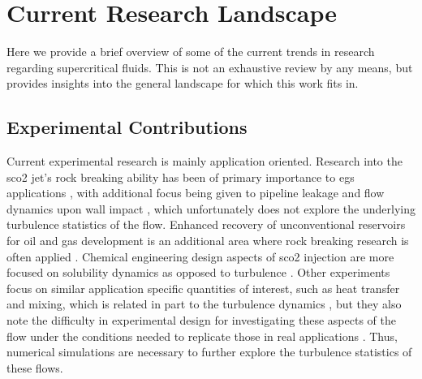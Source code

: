 
\section{Current Research Landscape}
Here we provide a brief overview of some of the current trends in research regarding supercritical fluids. This is not an exhaustive review by any means, but provides insights into the general landscape for which this work fits in. 
\subsection{Experimental Contributions}
Current experimental research is mainly application oriented. Research into the \gls{sco2} jet's rock breaking ability has been of primary importance to \gls{egs} applications \cite{EGScomp, EGS2, very_rock, experiment, rb}, with additional focus being given to pipeline leakage and flow dynamics upon wall impact \cite{WANG2015210, WANG201977}, which unfortunately does not explore the underlying turbulence statistics of the flow. Enhanced recovery of unconventional reservoirs for oil and gas development is an additional area where rock breaking research is often applied \cite{HUANG2020106735, HUANG2019}. Chemical engineering design aspects of \gls{sco2} injection are more focused on solubility dynamics as opposed to turbulence \cite{freejet, pulse_jet}. Other experiments focus on similar application specific quantities of interest, such as heat transfer and mixing, which is related in part to the turbulence dynamics \cite{heated_cyl, 10.1115/FEDSM2022-87029}, but they also note the difficulty in experimental design for investigating these aspects of the flow under the conditions needed to replicate those in real applications \cite{freejet}. Thus, numerical simulations are necessary to further explore the turbulence statistics of these flows.

